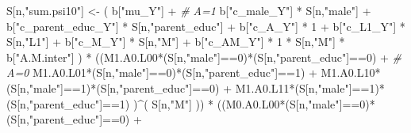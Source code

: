 \documentclass[
]{book}
\newenvironment{Shaded}{\begin{snugshade}}{\end{snugshade}}
\newcommand{\CommentTok}[1]{\textcolor[rgb]{0.56,0.35,0.01}{\textit{#1}}}
\newcommand{\DecValTok}[1]{\textcolor[rgb]{0.00,0.00,0.81}{#1}}
\newcommand{\NormalTok}[1]{#1}
\newcommand{\OtherTok}[1]{\textcolor[rgb]{0.56,0.35,0.01}{#1}}
\newcommand{\SpecialCharTok}[1]{\textcolor[rgb]{0.00,0.00,0.00}{#1}}
\newcommand{\StringTok}[1]{\textcolor[rgb]{0.31,0.60,0.02}{#1}}
\begin{document}
\begin{Shaded}
\begin{Highlighting}[]
\NormalTok{    S[n,}\StringTok{"sum.psi10"}\NormalTok{] }\OtherTok{\textless{}{-}}\NormalTok{  ( b[}\StringTok{"mu\_Y"}\NormalTok{] }\SpecialCharTok{+}                                          \CommentTok{\# A=1}
\NormalTok{                             b[}\StringTok{"c\_male\_Y"}\NormalTok{] }\SpecialCharTok{*}\NormalTok{ S[n,}\StringTok{"male"}\NormalTok{] }\SpecialCharTok{+} 
\NormalTok{                             b[}\StringTok{"c\_parent\_educ\_Y"}\NormalTok{] }\SpecialCharTok{*}\NormalTok{ S[n,}\StringTok{"parent\_educ"}\NormalTok{] }\SpecialCharTok{+} 
\NormalTok{                             b[}\StringTok{"c\_A\_Y"}\NormalTok{] }\SpecialCharTok{*} \DecValTok{1} \SpecialCharTok{+}
\NormalTok{                             b[}\StringTok{"c\_L1\_Y"}\NormalTok{] }\SpecialCharTok{*}\NormalTok{ S[n,}\StringTok{"L1"}\NormalTok{] }\SpecialCharTok{+}
\NormalTok{                             b[}\StringTok{"c\_M\_Y"}\NormalTok{] }\SpecialCharTok{*}\NormalTok{ S[n,}\StringTok{"M"}\NormalTok{] }\SpecialCharTok{+}
\NormalTok{                             b[}\StringTok{"c\_AM\_Y"}\NormalTok{] }\SpecialCharTok{*} \DecValTok{1} \SpecialCharTok{*}\NormalTok{ S[n,}\StringTok{"M"}\NormalTok{] }\SpecialCharTok{*}\NormalTok{ b[}\StringTok{"A.M.inter"}\NormalTok{] ) }\SpecialCharTok{*}
\NormalTok{      ((M1.A0.L00}\SpecialCharTok{*}\NormalTok{(S[n,}\StringTok{"male"}\NormalTok{]}\SpecialCharTok{==}\DecValTok{0}\NormalTok{)}\SpecialCharTok{*}\NormalTok{(S[n,}\StringTok{"parent\_educ"}\NormalTok{]}\SpecialCharTok{==}\DecValTok{0}\NormalTok{) }\SpecialCharTok{+}                    \CommentTok{\# A\textquotesingle{}=0}
\NormalTok{          M1.A0.L01}\SpecialCharTok{*}\NormalTok{(S[n,}\StringTok{"male"}\NormalTok{]}\SpecialCharTok{==}\DecValTok{0}\NormalTok{)}\SpecialCharTok{*}\NormalTok{(S[n,}\StringTok{"parent\_educ"}\NormalTok{]}\SpecialCharTok{==}\DecValTok{1}\NormalTok{) }\SpecialCharTok{+}
\NormalTok{          M1.A0.L10}\SpecialCharTok{*}\NormalTok{(S[n,}\StringTok{"male"}\NormalTok{]}\SpecialCharTok{==}\DecValTok{1}\NormalTok{)}\SpecialCharTok{*}\NormalTok{(S[n,}\StringTok{"parent\_educ"}\NormalTok{]}\SpecialCharTok{==}\DecValTok{0}\NormalTok{) }\SpecialCharTok{+} 
\NormalTok{          M1.A0.L11}\SpecialCharTok{*}\NormalTok{(S[n,}\StringTok{"male"}\NormalTok{]}\SpecialCharTok{==}\DecValTok{1}\NormalTok{)}\SpecialCharTok{*}\NormalTok{(S[n,}\StringTok{"parent\_educ"}\NormalTok{]}\SpecialCharTok{==}\DecValTok{1}\NormalTok{) )}\SpecialCharTok{\^{}}\NormalTok{( S[n,}\StringTok{"M"}\NormalTok{] )) }\SpecialCharTok{*}
\NormalTok{      ((M0.A0.L00}\SpecialCharTok{*}\NormalTok{(S[n,}\StringTok{"male"}\NormalTok{]}\SpecialCharTok{==}\DecValTok{0}\NormalTok{)}\SpecialCharTok{*}\NormalTok{(S[n,}\StringTok{"parent\_educ"}\NormalTok{]}\SpecialCharTok{==}\DecValTok{0}\NormalTok{) }\SpecialCharTok{+}                

\end{Highlighting}
\end{Shaded}
\end{document}
